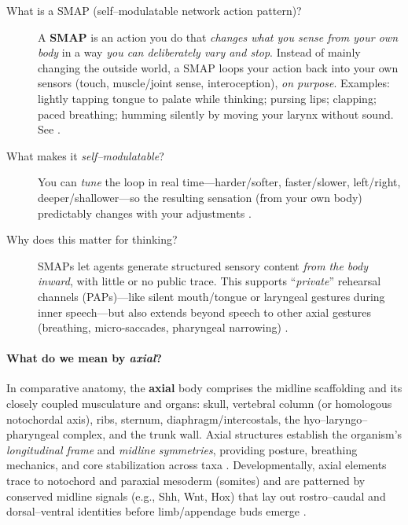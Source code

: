 \begin{description}
  \item[What is a SMAP (self–modulatable network action pattern)?]
  A \textbf{SMAP} is an action you do that \emph{changes what you sense from your own body} in a way \emph{you can deliberately vary and stop}. Instead of mainly changing the outside world, a SMAP loops your action back into your own sensors (touch, muscle/joint sense, interoception), \emph{on purpose}. Examples: lightly tapping tongue to palate while thinking; pursing lips; clapping; paced breathing; humming silently by moving your larynx without sound. See \citep{PezzuloCisek2016AffordanceLandscape,BlakemoreWolpertFrith1998Tickle,AldersonDayFernyhough2015InnerSpeech}.
  
  \item[What makes it \emph{self–modulatable}?]
  You can \emph{tune} the loop in real time—harder/softer, faster/slower, left/right, deeper/shallower—so the resulting sensation (from your own body) predictably changes with your adjustments \citep{MiallWolpert1996ForwardModels,TodorovJordan2002OFC}.
    
  \item[Why does this matter for thinking?]
  SMAPs let agents generate structured sensory content \emph{from the body inward}, with little or no public trace. This supports “\emph{private}” rehearsal channels (PAPs)—like silent mouth/tongue or laryngeal gestures during inner speech—but also extends beyond speech to other axial gestures (breathing, micro-saccades, pharyngeal narrowing) \citep{AldersonDayFernyhough2015InnerSpeech,Guenther2016NeuralControlSpeech,Seth2013InteroceptiveInference}.
\end{description}

\paragraph{What do we mean by \emph{axial}?}
In comparative anatomy, the \textbf{axial} body comprises the midline scaffolding and its closely coupled musculature and organs: skull, vertebral column (or homologous notochordal axis), ribs, sternum, diaphragm/intercostals, the hyo–laryngo–pharyngeal complex, and the trunk wall. Axial structures establish the organism’s \emph{longitudinal frame} and \emph{midline symmetries}, providing posture, breathing mechanics, and core stabilization across taxa \citep{Standring2021Grays,Kardong2019Vertebrates}. Developmentally, axial elements trace to notochord and paraxial mesoderm (somites) and are patterned by conserved midline signals (e.g., Shh, Wnt, Hox) that lay out rostro–caudal and dorsal–ventral identities before limb/appendage buds emerge \citep{GilbertBarresi2016DB,Carroll2005EndlessForms,Wellik2007HoxAxial}.

